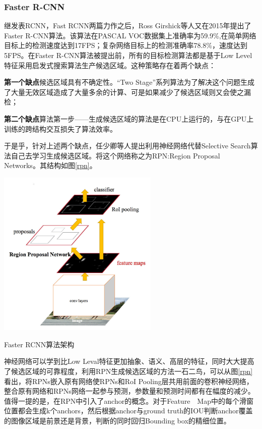 \subsubsection{Faster R-CNN}
继发表RCNN，Fast RCNN两篇力作之后，Ross Girshick等人又在2015年提出了Faster R-CNN\cite{fasterrcnn}算法。该算法在PASCAL VOC数据集上准确率为59.9\%,在简单网络目标上的检测速度达到17FPS；复杂网络目标上的检测准确率78.8\%，速度达到5FPS。在Faster R-CNN算法被提出前，所有的目标检测算法都是基于Low Level特征采用启发式搜索算法生产候选区域。这种策略存在着两个缺点：

\textbf{第一个缺点}候选区域具有不确定性。“Two Stage”系列算法为了解决这个问题生成了大量无效区域造成了大量多余的计算、可是如果减少了候选区域则又会使之漏检；

\textbf{第二个缺点}算法第一步——生成候选区域的算法是在CPU上运行的，与在GPU上训练的跨结构交互损失了算法效率。

于是乎，针对上述两个缺点，任少卿等人提出利用神经网络代替Selective Search算法自己去学习生成候选区域。将这个网络称之为RPN:Region Proposal Networks。其结构如图\ref{rpn}。
\begin{uscfigure}
	\includegraphics[width=\textwidth,height=8cm]{./Pictures/faster_rcnn.jpg}	
	\caption{Faster RCNN算法架构}	
	\label{rpn}
\end{uscfigure}
神经网络可以学到比Low Leval特征更加抽象、语义、高层的特征，同时大大提高了候选区域的可靠程度，利用RPN生成候选区域的方法一石二鸟，可以从图\ref{rpn}看出，将RPNs嵌入原有网络使RPNs和RoI Pooling层共用前面的卷积神经网络，整合原有网络和RPNs网络一起参与预测，参数量和预测时间都有在幅度的减少。值得一提的是，在RPN中引入了anchor的概念。对于Feature　Map中的每个滑窗位置都会生成k个anchors，然后根据anchor与ground truth的IOU判断anchor覆盖的图像区域是前景还是背景，判断的同时回归Bounding box的精细位置。

